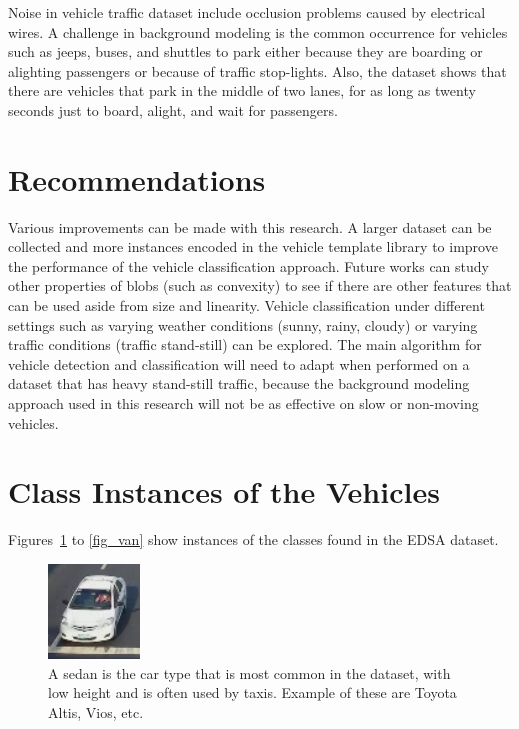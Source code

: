 \documentclass[conference]{IEEEtran}
\begin{document}
Noise in vehicle traffic dataset include occlusion problems caused by electrical wires. A challenge in background modeling is the common occurrence for vehicles such as jeeps, buses, and shuttles to park either because they are boarding or alighting passengers or because of traffic stop-lights. Also, the dataset shows that there are vehicles that park in the middle of two lanes, for as long as twenty seconds just to board, alight, and wait for passengers. 

\section{Recommendations}

Various improvements can be made with this research. A larger dataset can be collected and more instances encoded in the vehicle template library to improve the performance of the vehicle classification approach. Future works can study other properties of blobs (such as convexity) to see if there are other features that can be used aside from size and linearity. Vehicle classification under different settings such as varying weather conditions (sunny, rainy, cloudy) or varying traffic conditions (traffic stand-still) can be explored. The main algorithm for vehicle detection and classification will need to adapt when performed on a dataset that has heavy stand-still traffic, because the background modeling approach used in this research will not be as effective on slow or non-moving vehicles. 

\clearpage

\appendices
\section{Class Instances of the Vehicles}

Figures~\ref{fig_sedan} to \ref{fig_van} show instances of the classes found in the EDSA dataset.

\begin{figure}[!h]
\centering
\includegraphics{vehicle_sedan.png}
\caption{A sedan is the car type that is most common in the dataset, with low height and is often used by taxis. Example of these are Toyota Altis, Vios, etc.}
\label{fig_sedan}
\end{figure}
\end{document}
